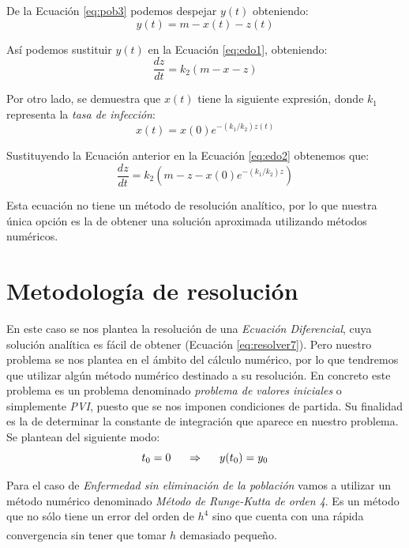\documentclass[a4paper,11pt]{article}
\numberwithin{equation}{section}
\begin{document}
\indent De la Ecuación \ref{eq:pob3} podemos despejar $ y(t) $ obteniendo:
\begin{equation}
y(t)=m-x(t)-z(t)
\label{eq:pob4}
\end{equation}

\indent Así podemos sustituir $ y(t) $ en la Ecuación \ref{eq:edo1}, obteniendo:
\begin{equation}
\frac{dz}{dt}=k_2(m-x-z)
\label{eq:edo2}
\end{equation}

\indent Por otro lado, se demuestra que $ x(t) $ tiene la siguiente expresión, donde $ k_1 $ representa la \textit{tasa de infección}:
\begin{equation}
x(t)=x(0)e^{-(k_1/k_2)z(t)}
\label{eq:x1}
\end{equation}

\indent Sustituyendo la Ecuación anterior en la Ecuación \ref{eq:edo2} obtenemos que:
\begin{equation}
\frac{dz}{dt}=k_2(m-z-x(0)e^{-(k_1/k_2)z})
\end{equation}

\indent Esta ecuación no tiene un método de resolución analítico, por lo que nuestra única opción es la de obtener una solución aproximada utilizando métodos numéricos.
 
\section{Metodología de resolución}
\indent En este caso se nos plantea la resolución de una \textit{Ecuación Diferencial}, cuya solución analítica es fácil de obtener (Ecuación \ref{eq:resolver7}). Pero nuestro problema se nos plantea en el ámbito del cálculo numérico, por lo que tendremos que utilizar algún método numérico destinado a su resolución. En concreto este problema es un problema denominado \textit{problema de valores iniciales} o simplemente \textit{PVI}, puesto que se nos imponen condiciones de partida. Su finalidad es la de determinar la constante de integración que aparece en nuestro problema. Se plantean del siguiente modo:
\begin{equation}
t_0=0 \hspace{0.5cm} \Rightarrow \hspace{0.5cm} y(t_0)=y_0
\label{eq:met1}
\end{equation}

\indent Para el caso de \textit{Enfermedad sin eliminación de la población} vamos a utilizar un método numérico denominado \textit{Método de Runge-Kutta de orden 4}. Es un método que no sólo tiene un error del orden de $ h^4 $ sino que cuenta con una rápida convergencia sin tener que tomar $ h $ demasiado pequeño.{\tiny \bf \textsuperscript{\cite{hoja2}}}\\
\end{document}
